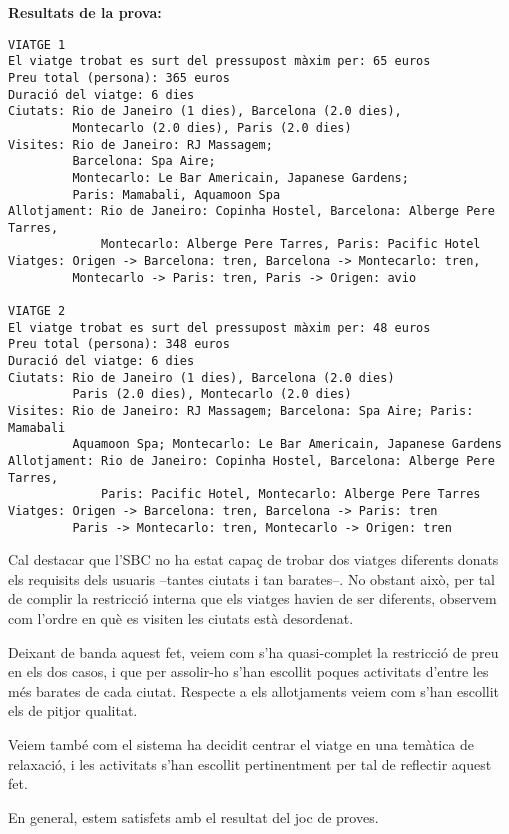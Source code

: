 \documentclass[11pt,a4paper]{article}
\begin{document}
\textbf{Resultats de la prova:} 
\begin{lstlisting}
VIATGE 1
El viatge trobat es surt del pressupost màxim per: 65 euros
Preu total (persona): 365 euros
Duració del viatge: 6 dies
Ciutats: Rio de Janeiro (1 dies), Barcelona (2.0 dies),
         Montecarlo (2.0 dies), Paris (2.0 dies)
Visites: Rio de Janeiro: RJ Massagem; 
         Barcelona: Spa Aire; 
         Montecarlo: Le Bar Americain, Japanese Gardens; 
         Paris: Mamabali, Aquamoon Spa
Allotjament: Rio de Janeiro: Copinha Hostel, Barcelona: Alberge Pere Tarres,
             Montecarlo: Alberge Pere Tarres, Paris: Pacific Hotel
Viatges: Origen -> Barcelona: tren, Barcelona -> Montecarlo: tren, 
         Montecarlo -> Paris: tren, Paris -> Origen: avio

VIATGE 2
El viatge trobat es surt del pressupost màxim per: 48 euros
Preu total (persona): 348 euros
Duració del viatge: 6 dies
Ciutats: Rio de Janeiro (1 dies), Barcelona (2.0 dies)
         Paris (2.0 dies), Montecarlo (2.0 dies)
Visites: Rio de Janeiro: RJ Massagem; Barcelona: Spa Aire; Paris: Mamabali
         Aquamoon Spa; Montecarlo: Le Bar Americain, Japanese Gardens
Allotjament: Rio de Janeiro: Copinha Hostel, Barcelona: Alberge Pere Tarres, 
             Paris: Pacific Hotel, Montecarlo: Alberge Pere Tarres
Viatges: Origen -> Barcelona: tren, Barcelona -> Paris: tren
         Paris -> Montecarlo: tren, Montecarlo -> Origen: tren

\end{lstlisting} 

\medskip
Cal destacar que l'SBC no ha estat capaç de trobar dos viatges diferents donats els requisits dels usuaris --tantes ciutats i tan barates--. No obstant això, per tal de complir la restricció interna que els viatges havien de ser diferents, observem com l'ordre en què es visiten les ciutats està desordenat.

Deixant de banda aquest fet, veiem com s'ha quasi-complet la restricció de preu en els dos casos, i que per assolir-ho s'han escollit poques activitats d'entre les més barates de cada ciutat. Respecte a els allotjaments veiem com s'han escollit els de pitjor qualitat.

Veiem també com el sistema ha decidit centrar el viatge en una temàtica de relaxació, i les activitats s'han escollit pertinentment per tal de reflectir aquest fet.

En general, estem satisfets amb el resultat del joc de proves.

\end{document}
